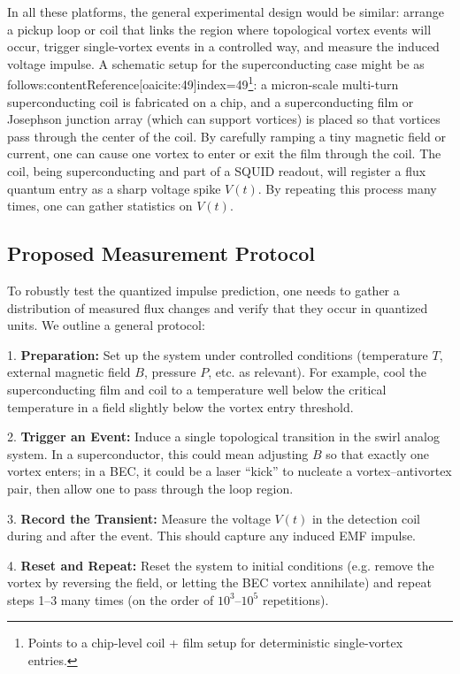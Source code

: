 \documentclass[12pt]{article}
\begin{document}
        In all these platforms, the general experimental design would be similar: arrange a pickup loop or coil that links the region where topological vortex events will occur, trigger single-vortex events in a controlled way, and measure the induced voltage impulse. A schematic setup for the superconducting case might be as follows:contentReference[oaicite:49]{index=49}\footnote{Points to a chip-level coil + film setup for deterministic single-vortex entries.}: a micron-scale multi-turn superconducting coil is fabricated on a chip, and a superconducting film or Josephson junction array (which can support vortices) is placed so that vortices pass through the center of the coil. By carefully ramping a tiny magnetic field or current, one can cause one vortex to enter or exit the film through the coil. The coil, being superconducting and part of a SQUID readout, will register a flux quantum entry as a sharp voltage spike $V(t)$. By repeating this process many times, one can gather statistics on $V(t)$.

    \subsection{Proposed Measurement Protocol}
        To robustly test the quantized impulse prediction, one needs to gather a distribution of measured flux changes and verify that they occur in quantized units. We outline a general protocol:

        1. \textbf{Preparation:} Set up the system under controlled conditions (temperature $T$, external magnetic field $B$, pressure $P$, etc. as relevant). For example, cool the superconducting film and coil to a temperature well below the critical temperature in a field slightly below the vortex entry threshold.

        2. \textbf{Trigger an Event:} Induce a single topological transition in the swirl analog system. In a superconductor, this could mean adjusting $B$ so that exactly one vortex enters; in a BEC, it could be a laser ``kick'' to nucleate a vortex--antivortex pair, then allow one to pass through the loop region.

        3. \textbf{Record the Transient:} Measure the voltage $V(t)$ in the detection coil during and after the event. This should capture any induced EMF impulse.

        4. \textbf{Reset and Repeat:} Reset the system to initial conditions (e.g. remove the vortex by reversing the field, or letting the BEC vortex annihilate) and repeat steps 1–3 many times (on the order of $10^3$–$10^5$ repetitions).
\end{document}
